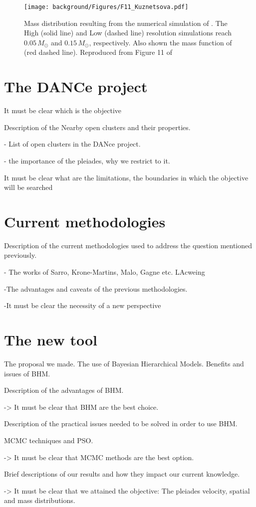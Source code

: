 \begin{figure}[htbp]
\begin{center}
\texttt{[image: background/Figures/F11\_Kuznetsova.pdf]}
\caption{Mass distribution resulting from the numerical simulation of \citet{2015ApJ...815...27K}. The High (solid line) and Low (dashed line) resolution simulations reach $0.05\, M_{\odot}$ and $0.15\, M_{\odot}$, respectively. Also shown the mass function of \citet{Chabrier2005} (red dashed line). Reproduced from Figure 11 of \citet{2015ApJ...815...27K}}
\label{fig:IMFKuznetsova}
\end{center}
\end{figure}

\section{The DANCe project}
\label{sect:DANCeproject}
It must be clear which is the objective

Description of the Nearby open clusters and their properties.

- List of open clusters in the DANce project.

- the importance of the pleiades, why we restrict to it.

It must be clear what are the limitations, the boundaries in which the objective will be searched

\section{Current methodologies}
\label{sect:current_methodologies}
Description of the current methodologies used to address the question mentioned previously.

- The works of Sarro, Krone-Martins, Malo, Gagne etc. LAcweing

-The advantages and caveats of the previous methodologies. 

-It must be clear the necessity of a new perspective

\section{The new tool}
\label{sect:newtool}

The proposal we made. The use of Bayesian Hierarchical Models. Benefits and issues of BHM.

Description of the advantages of BHM.

-> It must be clear that BHM are the best choice.

Description of the practical issues needed to be solved in order to use BHM.

MCMC techniques and  PSO.

-> It must be clear that MCMC methods are the best option.

Brief descriptions of our results and how they impact our current knowledge.

-> It must be clear that we attained the objective: The pleiades velocity, spatial and mass distributions.
 



